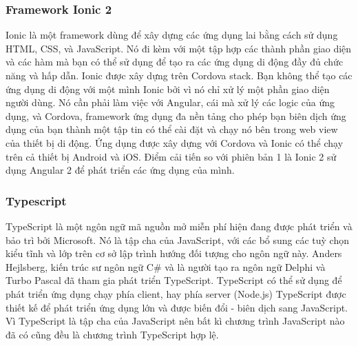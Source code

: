 \documentclass[a4paper,12pt,oneside]{article}
\begin{document}
\subsubsection{Framework Ionic 2}
\noindent Ionic là một framework dùng để xây dựng các ứng dụng lai bằng cách sử dụng HTML, CSS, và JavaScript. Nó đi kèm với một tập hợp các thành phần giao diện và các hàm mà bạn có thể sử dụng để tạo ra các ứng dụng di động đầy đủ chức năng và hấp dẫn. 
Ionic được xây dựng trên Cordova stack. Bạn không thể tạo các ứng dụng di động với một mình Ionic bởi vì nó chỉ xử lý một phần giao diện người dùng. Nó cần phải làm việc với Angular, cái mà xử lý các logic của ứng dụng, và Cordova, framework ứng dụng đa nền tảng cho phép bạn biên dịch ứng dụng của bạn thành một tập tin có thể cài đặt và chạy nó bên trong web view của thiết bị di động. 
Ứng dụng được xây dựng với Cordova và Ionic có thể chạy trên cả thiết bị Android và iOS.
Điểm cải tiến so với phiên bản 1 là Ionic 2 sử dụng Angular 2 để phát triển các ứng dụng của mình.
\subsubsection{Typescript}
\noindent TypeScript là một ngôn ngữ mã nguồn mở miễn phí hiện đang được phát triển và bảo trì bởi Microsoft. Nó là tập cha của JavaScript, với các bổ sung các tuỳ chọn kiểu tĩnh và lớp trên cơ sở lập trình hướng đối tượng cho ngôn ngữ này. Anders Hejlsberg, kiến trúc sư ngôn ngữ C\# và là người tạo ra ngôn ngữ Delphi và Turbo Pascal đã tham gia phát triển TypeScript. TypeScript có thể sử dụng để phát triển ứng dụng chạy phía client, hay phía server (Node.js)  
TypeScript được thiết kế để phát triển ứng dụng lớn và được biến đổi - biên dịch sang JavaScript. Vì TypeScript là tập cha của JavaScript nên bất kì chương trình JavaScript nào đã có cũng đều là chương trình TypeScript hợp lệ.  
\end{document}
